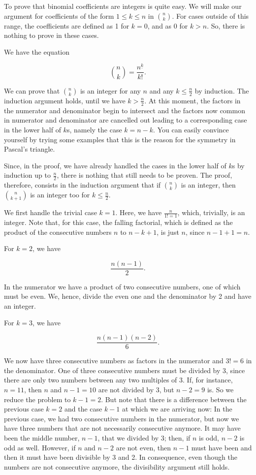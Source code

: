 \documentclass[tikz]{scrreprt}
\begin{document}
To prove that binomial coefficients are integers
is quite easy. 
We will make our argument for
coefficients of the form
$1 \le k \le n$ in $\binom{n}{k}$. 
For cases outside of this range,
the coefficients are defined as 1 for $k=0$,
and as 0 for $k > n$.
So, there is nothing to prove in these cases.

We have the equation

\begin{equation}
\binom{n}{k} = \frac{n^{\underline{k}}}{k!}.
\end{equation}

We can prove that $\binom{n}{k}$ is an integer
for any $n$ and any $k \le \frac{n}{2}$ by 
induction. 
The induction argument holds, until we have $k > \frac{n}{2}$.
At this moment, the factors in the numerator and denominator
begin to intersect and the factors now common in
numerator and denominator are cancelled out
leading to a corresponding case
in the lower half of $k$s, namely the case $k=n-k$.
You can easily convince yourself by trying 
some examples that this is the reason for 
the symmetry in Pascal's triangle.

Since, in the proof, 
we have already handled the cases 
in the lower half of $k$s by induction up to $\frac{n}{2}$,
there is nothing that still needs to be proven.
The proof, therefore, consists in the induction argument
that if $\binom{n}{k}$ is an integer,
then $\binom{n}{k+1}$ is an integer too
for $k \le \frac{n}{2}$.

We first handle the trivial case
$k=1$. Here, we have $\frac{n}{1!=1}$,
which, trivially, is an integer.
Note that, for this case, the falling factorial,
which is defined as the product of the
consecutive numbers $n$ to $n-k+1$, 
is just $n$, since $n-1+1 = n$.

For $k=2$, we have

\[
\frac{n(n-1)}{2}.
\]

In the numerator we have 
a product of two consecutive numbers,
one of which must be even. 
We, hence, divide the even one
and the denominator by 2 and have an integer.

For $k=3$, we have

\[
\frac{n(n-1)(n-2)}{6}.
\]

We now have three consecutive numbers
as factors in the numerator and $3! = 6$
in the denominator. One of three consecutive 
numbers must be divided by 3, since there are only
two numbers between any two multiples of 3.
If, for instance, $n=11$, then $n$ and $n-1 = 10$
are not divided by 3, but $n-2=9$ is.
So we reduce the problem to $k-1=2$.
But note that there is a difference 
between the previous case $k=2$
and the case $k-1$ at which we are arriving now:
In the previous case, we had two consecutive numbers
in the numerator, but now we have three numbers
that are not necessarily consecutive anymore.
It may have been the middle number, $n-1$,
that we divided by 3; then, if $n$ is odd,
$n-2$ is odd as well.
However, if $n$ and $n-2$ are not even,
then $n-1$ must have been and then it must
have been divisible by 3 and 2.
In consequence, even though the numbers
are not consecutive anymore,
the divisibility argument still holds.
\end{document}
